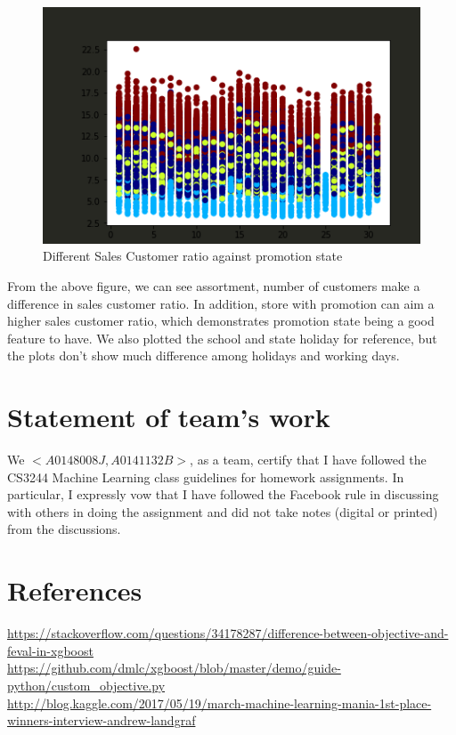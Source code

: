 \documentclass{article}
\begin{document}
\begin{figure}[h]
	\centering
	\includegraphics[scale=0.3]{Features/storetype.png}
	\caption{Different Sales Customer ratio against promotion state}
\end{figure}

From the above figure, we can see assortment, number of customers make a difference in sales customer ratio. In addition, store with promotion can aim a higher sales customer ratio, which demonstrates promotion state being a good feature to have. We also plotted the school and state holiday for reference, but the plots don't show much difference among holidays and working days.


 


\newpage

\section{Statement of team's work}

We $<A0148008J, A0141132B>$, as a team, certify that I have followed the CS3244 Machine Learning class guidelines for homework assignments.  In particular, I expressly vow that I have followed the Facebook rule in discussing with others in doing the assignment and did not take notes (digital or printed) from the discussions.  


\section{References}
\url{https://stackoverflow.com/questions/34178287/difference-between-objective-and-feval-in-xgboost}\\
\url{https://github.com/dmlc/xgboost/blob/master/demo/guide-python/custom_objective.py}\\
\url{http://blog.kaggle.com/2017/05/19/march-machine-learning-mania-1st-place-winners-interview-andrew-landgraf}\\
\end{document}
